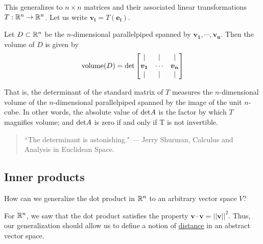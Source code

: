This generalizes to $n \times n$ matrices and their associated linear transformations $T:\mathbb{R}^n\to \mathbb{R}^n$.  Let us write $\bm{v_i} = T(\bm{e_i})$.

\begin{theorem}
    Let $D \subset \mathbb{R}^n$ be the $n$-dimensional parallelpiped spanned by $\bm{v_1}, \cdots, \bm{v_n}$.  Then the volume of $D$ is given by 
    $$\textnormal{volume}(D) = \textnormal{det}\begin{bmatrix}
\vert & \vert & \vert \\
    \bm{v_1}  & \cdots & \bm{v_n}  \\
    \vert & \vert & \vert
\end{bmatrix}$$
    
\end{theorem}

That is, the determinant of the standard matrix of $T$ measures the $n$-dimensional volume of the $n$-dimensional parallelpiped spanned by the image of the unit $n$-cube.  In other words, the absolute value of $\textnormal{det}A$ is the factor by which $T$ magnifies volume; and $\textnormal{det}A$ is zero if and only if T is not invertible. 



    \begin{quote}
        ``The determinant is astonishing."       --- Jerry Shurman, \textnormal{Calculus and Analysis in Euclidean Space}.
    \end{quote}








\subsection{Inner products}

\begin{motivating}
How can we generalize the dot product in  $\mathbb{R}^n$ to an arbitrary vector space $V$?  
\end{motivating}

For $\mathbb{R}^n$, we saw that the dot product satisfies the property $\bm{v} \cdot \bm{v} = ||\bm{v}||^2$. Thus, our generalization should allow us to define a notion of \underline{distance} in an abstract vector space.

